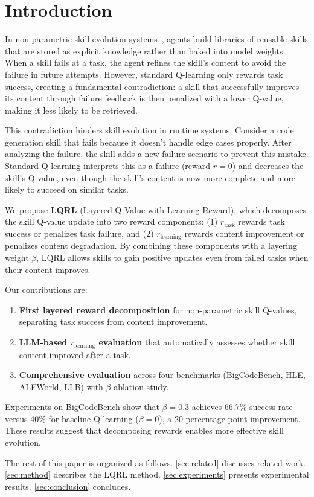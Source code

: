 \section{Introduction}

In non-parametric skill evolution systems~\citep{memrl,memskill,skillclaw}, agents build libraries of reusable skills that are stored as explicit knowledge rather than baked into model weights. When a skill fails at a task, the agent refines the skill's content to avoid the failure in future attempts. However, standard Q-learning only rewards task success, creating a fundamental contradiction: a skill that successfully improves its content through failure feedback is then penalized with a lower Q-value, making it less likely to be retrieved.

This contradiction hinders skill evolution in runtime systems. Consider a code generation skill that fails because it doesn't handle edge cases properly. After analyzing the failure, the skill adds a new failure scenario to prevent this mistake. Standard Q-learning interprets this as a failure (reward $r=0$) and decreases the skill's Q-value, even though the skill's content is now more complete and more likely to succeed on similar tasks.

We propose \textbf{LQRL} (Layered Q-Value with Learning Reward), which decomposes the skill Q-value update into two reward components: (1) $r_{\text{task}}$ rewards task success or penalizes task failure, and (2) $r_{\text{learning}}$ rewards content improvement or penalizes content degradation. By combining these components with a layering weight $\beta$, LQRL allows skills to gain positive updates even from failed tasks when their content improves.

Our contributions are:
\begin{enumerate}
    \item \textbf{First layered reward decomposition} for non-parametric skill Q-values, separating task success from content improvement.
    \item \textbf{LLM-based $r_{\text{learning}}$ evaluation} that automatically assesses whether skill content improved after a task.
    \item \textbf{Comprehensive evaluation} across four benchmarks (BigCodeBench, HLE, ALFWorld, LLB) with $\beta$-ablation study.
\end{enumerate}

Experiments on BigCodeBench show that $\beta=0.3$ achieves 66.7\% success rate versus 40\% for baseline Q-learning ($\beta=0$), a 20 percentage point improvement. These results suggest that decomposing rewards enables more effective skill evolution.

The rest of this paper is organized as follows. \cref{sec:related} discusses related work. \cref{sec:method} describes the LQRL method. \cref{sec:experiments} presents experimental results. \cref{sec:conclusion} concludes.
